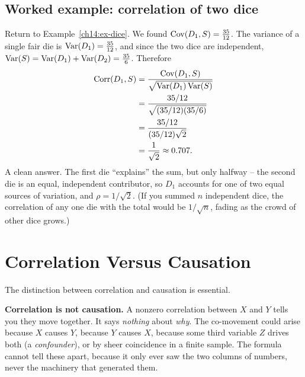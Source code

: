\subsection{Worked example: correlation of two dice}

\begin{example}[$\Corr(D_1, S)$]
\label{ch14:ex-corr-dice}
Return to Example~\ref{ch14:ex-dice}. We found $\operatorname{Cov}(D_1, S) = \tfrac{35}{12}$.
The variance of a single fair die is $\operatorname{Var}(D_1) = \tfrac{35}{12}$, and since the
two dice are independent, $\operatorname{Var}(S) = \operatorname{Var}(D_1) + \operatorname{Var}(D_2) = \tfrac{35}{6}$.
Therefore
\begin{align*}
\operatorname{Corr}(D_1, S) &= \frac{\operatorname{Cov}(D_1, S)}{\sqrt{\operatorname{Var}(D_1)\operatorname{Var}(S)}} \\
&= \frac{35/12}{\sqrt{(35/12)(35/6)}} \\
&= \frac{35/12}{(35/12)\sqrt{2}} \\
&= \frac{1}{\sqrt{2}} \approx 0.707.
\end{align*}
A clean answer. The first die ``explains'' the sum, but only halfway -- the second
die is an equal, independent contributor, so $D_1$ accounts for one of two equal
sources of variation, and $\rho = 1/\sqrt 2$. (If you summed $n$ independent dice,
the correlation of any one die with the total would be $1/\sqrt n$, fading as the
crowd of other dice grows.)
\end{example}

\section{Correlation Versus Causation}
\label{ch14:causation}

The distinction between correlation and causation is essential.

\begin{trapbox}
\textbf{Correlation is not causation.} A nonzero correlation between $X$ and $Y$
tells you they move together. It says \emph{nothing} about \emph{why}. The
co-movement could arise because $X$ causes $Y$, because $Y$ causes $X$, because some
third variable $Z$ drives both (a \emph{confounder}), or by sheer coincidence in a
finite sample. The formula cannot tell these apart, because it only ever saw the two
columns of numbers, never the machinery that generated them.
\end{trapbox}

